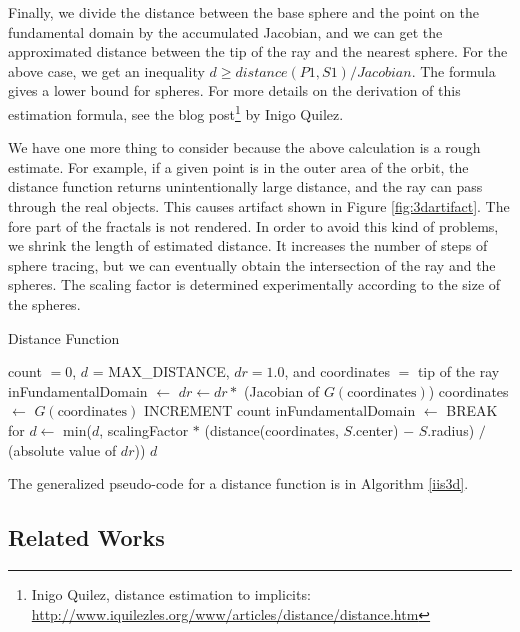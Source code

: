 Finally, we divide the distance between the base sphere and the point on
the fundamental domain by the accumulated Jacobian, and we can get the
approximated distance between the tip of the ray and the nearest sphere.
For the above case, we get an inequality $d \geq distance(P1, S1)/Jacobian$.
The formula gives a lower bound for spheres.
For more details on the derivation of this estimation formula, see the
blog post\footnote{Inigo Quilez, distance estimation to implicits:
\url{http://www.iquilezles.org/www/articles/distance/distance.htm}}
by Inigo Quilez.

We have one more thing to consider because the above calculation is
a rough estimate.
For example, if a given point is in the outer area of the orbit, the
distance function returns unintentionally large distance, and the ray
can pass through the real objects. This causes artifact shown in Figure
\ref{fig:3dartifact}. The fore part of the fractals is not rendered.
In order to avoid this kind of problems, we shrink the length of
estimated distance.
It increases the number of steps of sphere tracing, but we can
eventually obtain the intersection of the ray and the spheres.
The scaling factor is determined experimentally according to the size of
the spheres.

\begin{algorithm}
 \caption{Distance Function}
 \label{iis3d}
 \begin{algorithmic}
  \REQUIRE count $= 0$, $d$ = MAX\_DISTANCE, $dr = 1.0$, and coordinates
  $=$ tip of the ray
  \STATE inFundamentalDomain $\leftarrow$ \TRUE
  \STATE $dr \leftarrow dr * $ (Jacobian of $G(\text{coordinates})$)
  \STATE coordinates $\leftarrow$ $G(\text{coordinates})$
  \STATE INCREMENT count
  \STATE inFundamentalDomain $\leftarrow$ \FALSE
  \ENDIF
  \ENDFOR
  \STATE BREAK for
  \ENDIF
  \ENDFOR
  \STATE $d \leftarrow$ min($d$, scalingFactor $*$ (distance(coordinates, $S$.center) $-$
  $S$.radius) $/$ (absolute value of $dr$))
  \ENDFOR
  \RETURN $d$
 \end{algorithmic}
\end{algorithm}

The generalized pseudo-code for a distance function is in Algorithm \ref{iis3d}. 

\subsection{Related Works}

